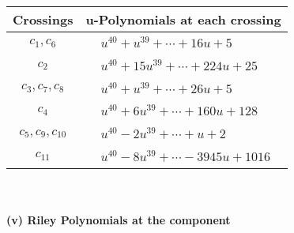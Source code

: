 \documentclass[1p]{elsarticle_modified}
\theoremstyle{definition}
\begin{document}
\begin{tabular}{m{50pt}|m{274pt}}
Crossings & \hspace{64pt}u-Polynomials at each crossing \\
\hline $$\begin{aligned}c_{1},c_{6}\end{aligned}$$&$\begin{aligned}
&u^{40}+u^{39}+\cdots+16 u+5
\end{aligned}$\\
\hline $$\begin{aligned}c_{2}\end{aligned}$$&$\begin{aligned}
&u^{40}+15 u^{39}+\cdots+224 u+25
\end{aligned}$\\
\hline $$\begin{aligned}c_{3},c_{7},c_{8}\end{aligned}$$&$\begin{aligned}
&u^{40}+u^{39}+\cdots+26 u+5
\end{aligned}$\\
\hline $$\begin{aligned}c_{4}\end{aligned}$$&$\begin{aligned}
&u^{40}+6 u^{39}+\cdots+160 u+128
\end{aligned}$\\
\hline $$\begin{aligned}c_{5},c_{9},c_{10}\end{aligned}$$&$\begin{aligned}
&u^{40}-2 u^{39}+\cdots+u+2
\end{aligned}$\\
\hline $$\begin{aligned}c_{11}\end{aligned}$$&$\begin{aligned}
&u^{40}-8 u^{39}+\cdots-3945 u+1016
\end{aligned}$\\
\hline
\end{tabular}\\~\\
\newpage\renewcommand{\arraystretch}{1}
\flushleft \textbf{(v) Riley Polynomials at the component}\newline \\
\end{document}
